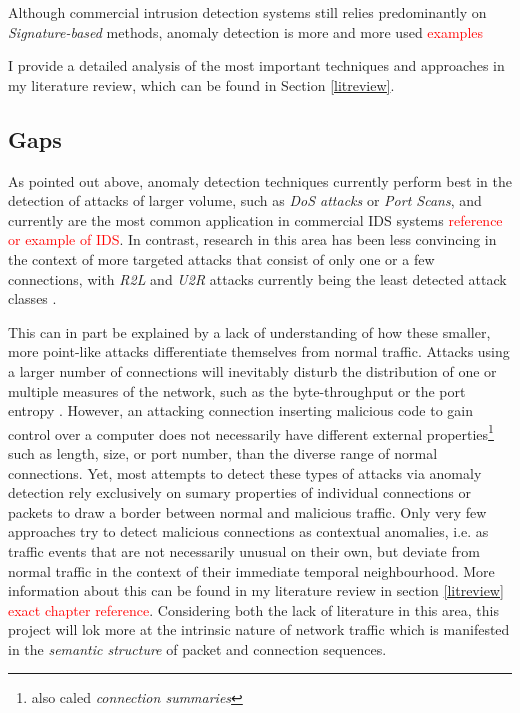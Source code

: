 \documentclass[a4paper,12pt,twoside]{report}
\begin{document}
Although commercial intrusion detection systems still relies predominantly on \textit{Signature-based} methods, anomaly detection is more and more used  \textcolor{red}{examples}


I provide a detailed analysis of the most important techniques and approaches in my literature review, which can be found in Section \ref{litreview}. 


\subsection{Gaps}

As pointed out above, anomaly detection techniques currently perform best in the detection of attacks of larger volume, such as \textit{DoS attacks} or \textit{Port Scans}, and currently are the most common application in commercial IDS systems \textcolor{red}{reference or example of IDS}. In contrast, research in this area has been less convincing in the context of more targeted attacks that consist of only one or a few connections, with \textit{R2L} and \textit{U2R} attacks currently being the least detected attack classes \cite{nisioti2018intrusion}. 

This can in part be explained by a lack of understanding of how these smaller, more point-like attacks differentiate themselves from normal traffic. Attacks using a larger number of connections will inevitably disturb the  distribution of one or multiple measures of the network, such as the byte-throughput or the port entropy \cite{lakhina2005mining}. However, an attacking connection inserting malicious code to gain control over a computer does not necessarily have different external properties\footnote{also caled \textit{connection summaries}} such as length, size, or port number, than the diverse range of normal connections. Yet, most attempts to detect these types of attacks via anomaly detection rely exclusively on sumary properties of individual connections or packets to draw a border between normal and malicious traffic. Only very few approaches try to detect malicious connections as contextual anomalies, i.e. as traffic events that are not necessarily unusual on their own, but deviate from normal traffic in the context of their immediate temporal neighbourhood. More information about this can be found in my literature review in section \ref{litreview} \textcolor{red}{exact chapter reference}. Considering both the lack of literature in this area, this project will lok more at the intrinsic nature of network traffic which is manifested in the \textit{semantic structure} of packet and connection sequences. 
\end{document}
